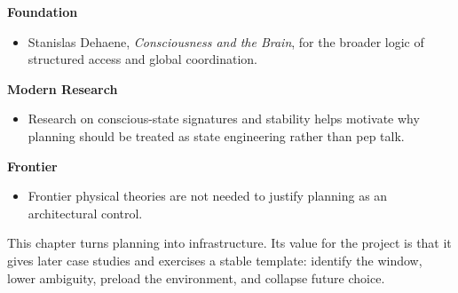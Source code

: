 \begin{readingbox}
\textbf{Foundation}
\begin{itemize}[nosep]
  \item Stanislas Dehaene, \emph{Consciousness and the Brain}, for the broader
        logic of structured access and global coordination.
\end{itemize}
\textbf{Modern Research}
\begin{itemize}[nosep]
  \item Research on conscious-state signatures and stability helps motivate why
        planning should be treated as state engineering rather than pep talk.
\end{itemize}
\textbf{Frontier}
\begin{itemize}[nosep]
  \item Frontier physical theories are not needed to justify planning as an
        architectural control.
\end{itemize}
\end{readingbox}

\begin{summarybox}
This chapter turns planning into infrastructure. Its value for the project is
that it gives later case studies and exercises a stable template: identify the
window, lower ambiguity, preload the environment, and collapse future choice.
\end{summarybox}
